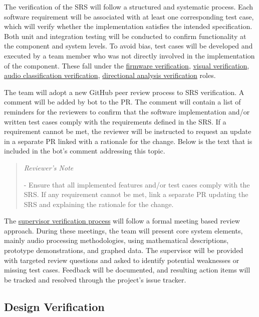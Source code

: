 \documentclass[12pt, titlepage]{article}
\newenvironment{shadedquotation}
    {\begin{quote}\itshape} {\end{quote}}
\begin{document}
The verification of the SRS will follow a structured and systematic process.
Each software requirement will be associated with at least one corresponding
test case, which will verify whether the implementation satisfies the intended
specification. Both unit and integration testing will be conducted to confirm
functionality at the component and system levels. To avoid bias, test cases will
be developed and executed by a team member who was not directly involved in the
implementation of the component. These fall under the
\hyperref[role:firmware_verfication]{firmware verification},
\hyperref[role:visual_vnv]{visual verification},
\hyperref[role:classification_verfication]{audio classification verification},
\hyperref[role:directional_verfication]{directional analysis verification}
roles. \newline

The team will adopt a new GitHub peer review process to SRS verification. A
comment will be added by bot to the PR. The comment will contain a list of
reminders for the reviewers to confirm that the software implementation and/or
written test cases comply with the requirements defined in the SRS. If a
requirement cannot be met, the reviewer will be instructed to request an update
in a separate PR linked with a rationale for the change. Below is the text that
is included in the bot's comment addressing this topic. \newline

\begin{shadedquotation}
Reviewer's Note

- Ensure that all implemented features and/or test cases comply with the SRS. If
any requirement cannot be met, link a separate PR updating the SRS and
explaining the rationale for the change.
\end{shadedquotation}

The 
\hyperref[role:audio_processing_verification]{supervisor verification process}
will follow a formal meeting based review approach. During these meetings, the
team will present core system elements, mainly audio processing methodologies,
using mathematical descriptions, prototype demonstrations, and graphed data. The
supervisor will be provided with targeted review questions and asked to identify
potential weaknesses or missing test cases. Feedback will be documented, and
resulting action items will be tracked and resolved through the project's issue
tracker. \newline


\subsection{Design Verification}\label{sec:design_verification}
\end{document}
